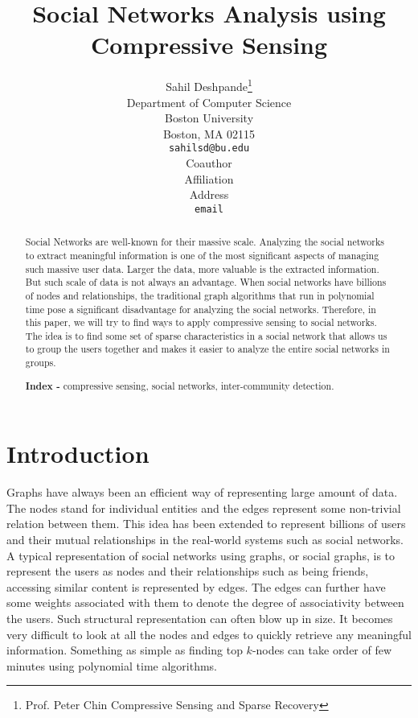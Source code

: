 \documentclass{article}
\title{Social Networks Analysis using Compressive Sensing}
\author{
  Sahil Deshpande\thanks{Prof. Peter Chin
    Compressive Sensing and Sparse Recovery} \\
  Department of Computer Science\\
  Boston University\\
  Boston, MA 02115 \\
  \texttt{sahilsd@bu.edu} \\
  \And
  Coauthor \\
  Affiliation \\
  Address \\
  \texttt{email} \\
}
\begin{document}

\maketitle

\begin{abstract}
Social Networks are well-known for their massive scale. Analyzing the social networks to extract meaningful information
is one of the most significant aspects of managing such massive user data. Larger the data, more valuable is the
extracted information. But such scale of data is not always an advantage. When social networks have billions of nodes
and relationships, the traditional graph algorithms that run in polynomial time pose a significant disadvantage for
analyzing the social networks. Therefore, in this paper, we will try to find ways to apply compressive sensing to social
networks. The idea is to find some set of sparse characteristics in a social network that allows us to group the users
together and makes it easier to analyze the entire social networks in groups.

\textbf{Index - } compressive sensing, social networks, inter-community detection.
\end{abstract}

\section{Introduction}
Graphs have always been an efficient way of representing large amount of data. The nodes stand for individual entities
and the edges represent some non-trivial relation between them. This idea has been extended to represent billions of
users and their mutual relationships in the real-world systems such as social networks. A typical representation of
social networks using graphs, or social graphs, is to represent the users as nodes and their relationships such as being
friends, accessing similar content is represented by edges. The edges can further have some weights associated with them
to denote the degree of associativity between the users. Such structural representation can often blow up in size. It
becomes very difficult to look at all the nodes and edges to quickly retrieve any meaningful information. Something as
simple as finding top $k$-nodes can take order of few minutes using polynomial time algorithms. 
\end{document}
